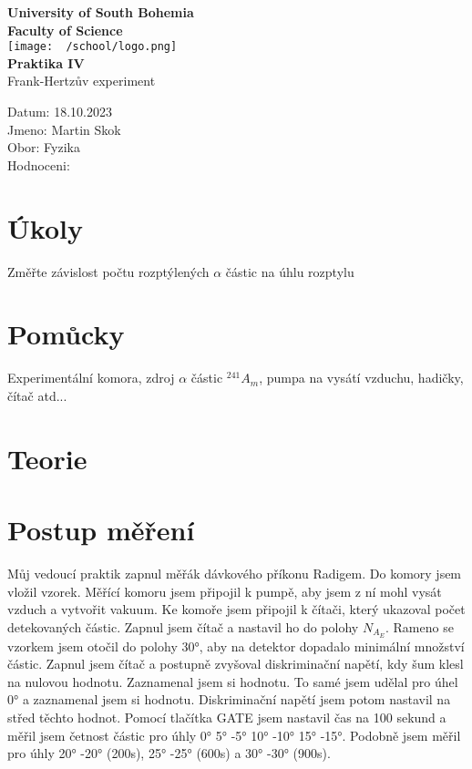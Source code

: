 \documentclass{article}
\begin{document}
\begin{center}
\textbf{\Huge{University of South Bohemia}}\\
\vspace{50px}
\textbf{\Large{Faculty of Science}} \\
\vspace{30px}
\texttt{[image: ~/school/logo.png]} \\
\vspace{30px}
\textbf{\large{Praktika IV}}
\vspace{20px}
\\
\vspace{20px}
\large{Frank-Hertzův experiment} \\
\vspace{60px}
\end{center}
\begin{flushleft}
Datum: 18.10.2023 \\
Jmeno: Martin Skok \\
Obor: Fyzika \\
Hodnoceni:
\end{flushleft}
\newpage
\section{Úkoly}
Změřte závislost počtu rozptýlených $\alpha$ částic na úhlu rozptylu
\section{Pomůcky}
Experimentální komora, zdroj $\alpha$ částic $^{241}A_{m}$, pumpa na vysátí vzduchu, hadičky, čítač atd...
\section{Teorie}
\section{Postup měření}
Můj vedoucí praktik zapnul měřák dávkového příkonu Radigem.
Do komory jsem vložil vzorek.
Měřící komoru jsem připojil k pumpě, aby jsem z ní mohl vysát vzduch a vytvořit vakuum.
Ke komoře jsem připojil k čítači, který ukazoval počet detekovaných částic.
Zapnul jsem čítač a nastavil ho do polohy $N_{A_E}$.
Rameno se vzorkem jsem otočil do polohy 30°, aby na detektor dopadalo minimální množství částic.
Zapnul jsem čítač a postupně zvyšoval diskriminační napětí, kdy šum klesl na nulovou hodnotu.
Zaznamenal jsem si hodnotu.
To samé jsem udělal pro úhel 0° a zaznamenal jsem si hodnotu.
Diskriminační napětí jsem potom nastavil na střed těchto hodnot.
Pomocí tlačítka GATE jsem nastavil čas na 100 sekund a měřil jsem četnost částic pro úhly 0° 5° -5° 10° -10° 15° -15°.
Podobně jsem měřil pro úhly 20° -20° (200s), 25° -25° (600s) a 30° -30° (900s).
\section{}
\section{}
\section{}
\end{document}
